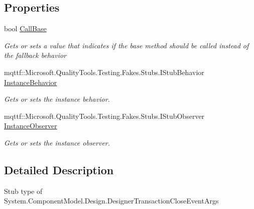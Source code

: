 \subsection*{Properties}
\begin{DoxyCompactItemize}
\item 
bool \hyperlink{class_system_1_1_component_model_1_1_design_1_1_fakes_1_1_stub_designer_transaction_close_event_args_a2c77bd75714e7394906da60ae071fa27}{Call\-Base}
\begin{DoxyCompactList}\small\item\em Gets or sets a value that indicates if the base method should be called instead of the fallback behavior\end{DoxyCompactList}\item 
mqttf\-::\-Microsoft.\-Quality\-Tools.\-Testing.\-Fakes.\-Stubs.\-I\-Stub\-Behavior \hyperlink{class_system_1_1_component_model_1_1_design_1_1_fakes_1_1_stub_designer_transaction_close_event_args_a0cc9bdfb721d69e4c8e7ac9d713e4b68}{Instance\-Behavior}
\begin{DoxyCompactList}\small\item\em Gets or sets the instance behavior.\end{DoxyCompactList}\item 
mqttf\-::\-Microsoft.\-Quality\-Tools.\-Testing.\-Fakes.\-Stubs.\-I\-Stub\-Observer \hyperlink{class_system_1_1_component_model_1_1_design_1_1_fakes_1_1_stub_designer_transaction_close_event_args_af3e32db35be9ad10ab650add9ed57b01}{Instance\-Observer}
\begin{DoxyCompactList}\small\item\em Gets or sets the instance observer.\end{DoxyCompactList}\end{DoxyCompactItemize}


\subsection{Detailed Description}
Stub type of System.\-Component\-Model.\-Design.\-Designer\-Transaction\-Close\-Event\-Args



